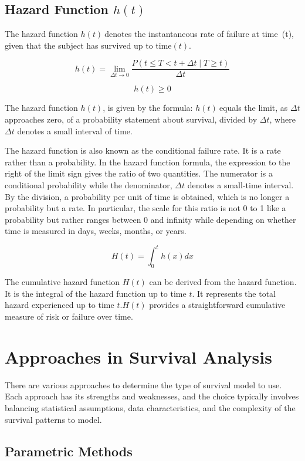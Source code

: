 \documentclass[doublespacing]{report} %
\begin{document}
\subsection{\texorpdfstring{Hazard Function \( h(t) \)}{Hazard Function h(t)}}

The hazard function \( h(t)\ \)denotes the instantaneous rate of failure at time\ (t), given that the subject has survived up to time\( (t).\)

\[
h(t) = \lim_{\Delta t \to 0} \frac{P(t \le T < t + \Delta t \mid T \geq t)}{\Delta t}
\]

\[h\left(t\right)\geq0\]


The hazard function \( h\left(t\right)\), is given by the formula: \(h\left(t\right)\ \)equals the limit, as \(\Delta t \) approaches zero, of a probability statement about survival, divided by \(\Delta t\), where \(\Delta t\) denotes a small interval of time.

The hazard function is also known as the conditional failure rate. It is a rate rather than a probability. In the hazard function formula, the expression to the right of the limit sign gives the ratio of two quantities. The numerator is a conditional probability while the denominator, \(\Delta t\) denotes a small-time interval. By the division, a probability per unit of time is obtained, which is no longer a probability but a rate. In particular, the scale for this ratio is not 0 to 1 like a probability but rather ranges between 0 and infinity while depending on whether time is measured in days, weeks, months, or years. 

\[H(t)=\int_{0}^{t}{h(x)dx}\]

The cumulative hazard function \(H(t)\) can be derived from the hazard function. It is the integral of the hazard function up to time \(t\). It represents the total hazard experienced up to time \( t. H(t)\) provides a straightforward cumulative measure of risk or failure over time.

\section{Approaches in Survival Analysis}

There are various approaches to determine the type of survival model to use. Each approach has its strengths and weaknesses, and the choice typically involves balancing statistical assumptions, data characteristics, and the complexity of the survival patterns to model.

\subsection{Parametric Methods}
\end{document}
